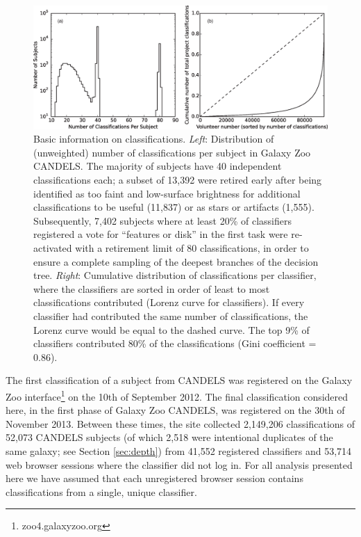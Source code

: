 \documentclass[useAMS,usenatbib]{mn2e}
\begin{document}
{%

\begin{figure}
\includegraphics[scale=0.67]{classifications_users_basicinfo.eps}
\caption{
Basic information on classifications. \emph{Left}: Distribution of (unweighted) number of classifications per subject in Galaxy Zoo CANDELS. The majority of subjects have 40 independent classifications each; a subset of 13,392 were retired early after being identified as too faint and low-surface brightness for additional classifications to be useful (11,837) or as stars or artifacts (1,555). Subsequently, 7,402 subjects where at least 20\% of classifiers registered a vote for ``features or disk'' in the first task were re-activated with a retirement limit of 80 classifications, in order to ensure a complete sampling of the deepest branches of the decision tree. \emph{Right}: Cumulative distribution of classifications per classifier, where the classifiers are sorted in order of least to most classifications contributed (Lorenz curve for classifiers). If every classifier had contributed the same number of classifications, the Lorenz curve would be equal to the dashed curve. The top 9\% of classifiers contributed 80\% of the classifications (Gini coefficient = 0.86). 
}
\label{fig:classification_basic_info}
\end{figure}


The first classification of a subject from CANDELS was registered on the Galaxy Zoo interface\footnote{zoo4.galaxyzoo.org} on the 10th of September 2012. The final classification considered here, in the first phase of Galaxy Zoo CANDELS, was registered on the 30th of November 2013. Between these times, the site collected 2,149,206 classifications of 52,073 CANDELS subjects (of which 2,518 were intentional duplicates of the same galaxy; see Section \ref{sec:depth}) from 41,552 registered classifiers and 53,714 web browser sessions where the classifier did not log in. For all analysis presented here we have assumed that each unregistered browser session contains classifications from a single, unique classifier. 

}
\end{document}
